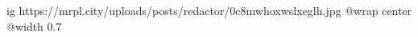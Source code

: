  
 
 
 
 

\ifcmt
  ig https://mrpl.city/uploads/posts/redactor/0c8mwhoxwslxeglh.jpg
  @wrap center
  @width 0.7
\fi
